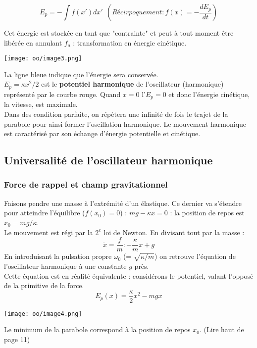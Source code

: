 \documentclass[british,french,11pt, a4paper, openany]{book}
\begin{document}
	\begin{equation}
		E_p = - \int f(x') dx'\ \ \left(Récirpoquement : f(x) = -\frac{dE_p}{dt}\right)
	\end{equation}
	
	Cet énergie est stockée en tant que "contrainte" et peut à tout moment être libérée en annulant $f_a$ : transformation en énergie cinétique.
	\begin{center}
		\texttt{[image: oo/image3.png]}
	\end{center}
	La ligne bleue indique que l'énergie sera conservée.\\
	$E_p = \kappa x^2 / 2$ est le \textbf{potentiel harmonique} de l'oscillateur (harmonique) représenté par le courbe rouge. Quand $x = 0$ l'$E_p = 0$ et donc l'énergie cinétique, la vitesse, est maximale.\\
	Dans des condition parfaite, on répètera une infinité de fois le trajet de la parabole pour ainsi former l'oscillation harmonique. Le mouvement harmonique est caractérisé par son échange d'énergie potentielle et cinétique.
	
	\subsection{Universalité de l'oscillateur harmonique}
	\subsubsection{Force de rappel et champ gravitationnel}
	Faisons pendre une masse à l'extrémité d'un élastique. Ce dernier va s'étendre pour atteindre l'équilibre ($f(x_0)=0$) : $mg - \kappa x = 0$ : la position de repos est $x_0 = mg/\kappa$.\\
	Le mouvement est régi par la $2^e$ loi de Newton. En divisant tout par la masse :
	\begin{equation}
		\ddot{x} = \frac{f}{m} : -\frac{\kappa}{m}x + g
	\end{equation}
	En introduisant la pulsation propre $\omega_0$ (= $\sqrt{\kappa/m}$) on retrouve l'équation de l'oscillateur harmonique à une constante $g$ près.\\
	
	Cette équation est en réalité équivalente : considérons le potentiel, valant l'opposé de la primitive de la force.
	\begin{equation}
		E_p(x) = \frac{\kappa}{2}x^2 - mgx
	\end{equation}
	\begin{center}
		\texttt{[image: oo/image4.png]}
	\end{center}
	Le minimum de la parabole correspond à la position de repos $x_0$.  (Lire haut de page 11)
	
\end{document}
